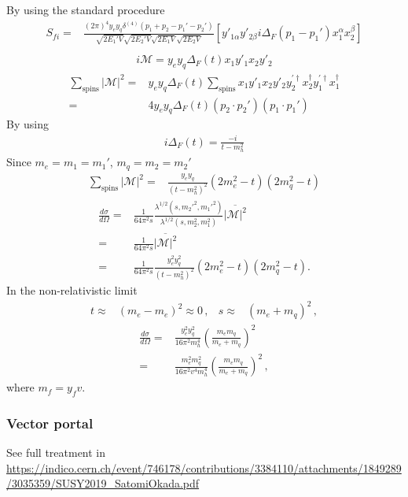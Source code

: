 By using the standard procedure
\begin{align}
      S_{fi}
    =&\frac{(2\pi)^4y_e y_q \delta^{(4)}\left(p_1+p_2-p_1'-p_2'\right) }{\sqrt{2 E_1'V}\sqrt{2 E_2'V}\sqrt{2 E_1V}\sqrt{2 E_2V}}
 \left[y'_{1\alpha}y'_{2\beta}i\Delta_F(p_1-p_1')x_1^{\alpha}x_2^{\beta}\right] \nonumber\\
\end{align}
\begin{align}
 i\mathcal{M}=y_e y_q\Delta_F(t) x_1y'_1x_2y'_2 
\end{align}
\begin{align}
\sum_{\text{spins}} |\mathcal{M}|^2=&y_e y_q\Delta_F(t) \sum_{\text{spins}}  x_1y'_1x_2y'_2  y^{\prime\dagger}_2x_2^{\dagger} y^{\prime\dagger}_1x^{\dagger}_1 \nonumber\\
=& 4 y_e y_q\Delta_F(t) \left( p_2\cdot p_2' \right) \left(p_1\cdot p_1'  \right)
\end{align}
By using
\begin{align}
  i\Delta_F(t)=\frac{-i}{t-m_h^2}
\end{align}
Since $m_e=m_1=m_1'$, $m_q=m_2=m_2'$
\begin{align}
   \sum_{\text{spins}} |\mathcal{M}|^2=&\frac{y_ey_q}{\left( t-m_h^2 \right)^2} \left(2m_e^2-t\right)\left(2m_q^2-t\right)
\end{align}
\begin{align}
     \frac{d\sigma}{d\Omega}=&\frac{1}{64\pi^2s}
\frac{\lambda^{1/2}(s,{m_2'}^2,{m_1'}^2)}{\lambda^{1/2}(s,m_2^2,m_1^2)}
\overline{|\mathcal{M}|^2} \nonumber\\
=&\frac{1}{64\pi^2s}\overline{|\mathcal{M}|^2} \nonumber\\
=&\frac{1}{64\pi^2s}\frac{y_e^2y_q^2}{\left( t-m_h^2 \right)^2}\left(2m_e^2-t\right)\left(2m_q^2-t\right) .
\end{align}
In the non-relativistic limit
\begin{align}
  t\approx& (m_e-m_e)^2\approx 0\,,& 
  s\approx& (m_e+m_q)^2\,,
\end{align}
\begin{align}
       \frac{d\sigma}{d\Omega}
                    =&\frac{y_e^2y_q^2}{16\pi^2m_h^4}\left( \frac{m_em_q}{m_e+m_q} \right)^2 \nonumber\\
=&\frac{m_e^2m_q^2}{16\pi^2v^4 m_h^4}\left( \frac{m_em_q}{m_e+m_q} \right)^2\,,
\end{align}
where $m_f=y_f v$.

\subsubsection{Vector portal}
See full treatment in \url{https://indico.cern.ch/event/746178/contributions/3384110/attachments/1849289/3035359/SUSY2019_SatomiOkada.pdf}
